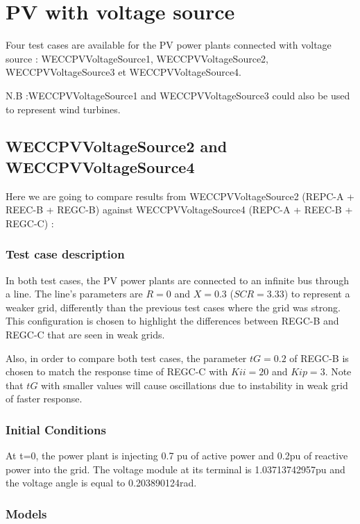 \documentclass[a4paper, 12pt]{report}
\begin{document}
\section{PV with voltage source}
Four test cases are available for the PV power plants connected with voltage source : WECCPVVoltageSource1, WECCPVVoltageSource2, WECCPVVoltageSource3 et WECCPVVoltageSource4.

N.B :WECCPVVoltageSource1 and WECCPVVoltageSource3 could also be used to represent wind turbines.

\subsection{WECCPVVoltageSource2 and WECCPVVoltageSource4}
Here we are going to compare results from WECCPVVoltageSource2 (REPC-A + REEC-B + REGC-B) against WECCPVVoltageSource4 (REPC-A + REEC-B + REGC-C) :

\subsubsection{Test case description}
In both test cases, the PV power plants are connected to an infinite bus through a line.
The line's parameters are $R = 0$ and $X = 0.3$ ($SCR = 3.33 $) to represent a weaker grid, differently than the previous test cases where the grid was strong.
This configuration is chosen to highlight the differences between REGC-B and REGC-C that are seen in weak grids.

Also, in order to compare both test cases, the parameter $tG = 0.2$ of REGC-B is chosen to match the response time of REGC-C with $Kii = 20$ and $Kip = 3$. Note that $tG$ with smaller values will cause oscillations due to instability in weak grid of faster response.


\subsubsection{Initial Conditions}

\par At t=0, the power plant is injecting 0.7 pu of active power and 0.2pu of reactive power into the grid. The voltage module at its terminal is 1.03713742957pu and the voltage angle is equal to 0.203890124rad.

\subsubsection{Models}
\end{document}
